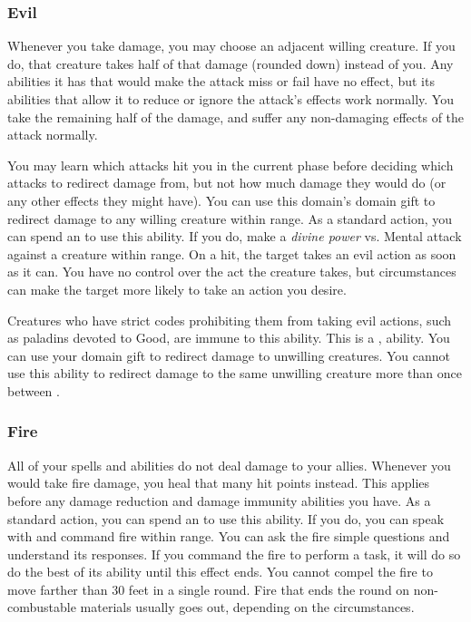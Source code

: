         \subsubsection{Evil}
             Whenever you take damage, you may choose an adjacent willing creature.
            If you do, that creature takes half of that damage (rounded down) instead of you.
            Any abilities it has that would make the attack miss or fail have no effect, but its abilities that allow it to reduce or ignore the attack's effects work normally.
            You take the remaining half of the damage, and suffer any non-damaging effects of the attack normally.
            \par You may learn which attacks hit you in the current phase before deciding which attacks to redirect damage from, but not how much damage they would do (or any other effects they might have).
             You can use this domain's domain gift to redirect damage to any willing creature within \rngclose range.
             As a standard action, you can spend an  to use this ability.
            If you do, make a \textit{divine power} vs. Mental attack against a creature within \rngmed range.
            On a hit, the target takes an evil action as soon as it can.
            You have no control over the act the creature takes, but circumstances can make the target more likely to take an action you desire.

            Creatures who have strict codes prohibiting them from taking evil actions, such as paladins devoted to Good, are immune to this ability.
            This is a ,  ability.
             You can use your domain gift to redirect damage to unwilling creatures.
            You cannot use this ability to redirect damage to the same unwilling creature more than once between .

        \subsubsection{Fire}
             All of your  spells and abilities do not deal damage to your allies.
             Whenever you would take fire damage, you heal that many hit points instead.
            This applies before any damage reduction and damage immunity abilities you have.
             As a standard action, you can spend an  to use this ability.
            If you do, you can speak with and command fire within \rnglong range.
            You can ask the fire simple questions and understand its responses.
            If you command the fire to perform a task, it will do so do the best of its ability until this effect ends.
            You cannot compel the fire to move farther than 30 feet in a single round.
            Fire that ends the round on non-combustable materials usually goes out, depending on the circumstances.

